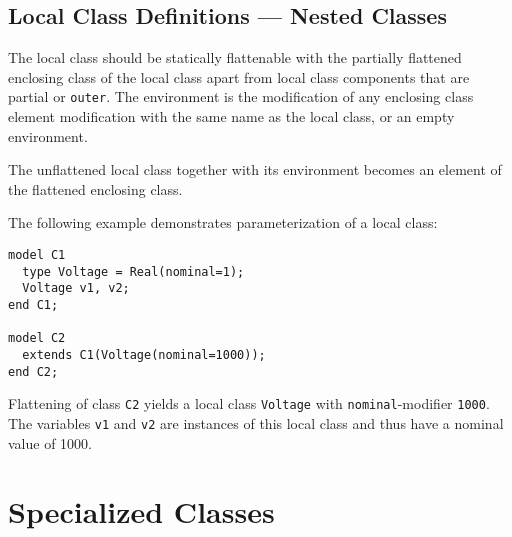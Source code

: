 \subsection{Local Class Definitions --- Nested Classes}\label{local-class-definitions-nested-classes}

The local class should be statically flattenable with the partially
flattened enclosing class of the local class apart from local class
components that are partial or \lstinline!outer!. The environment is the
modification of any enclosing class element modification with the same
name as the local class, or an empty environment.

The unflattened local class together with its environment becomes an
element of the flattened enclosing class.

\begin{example}
The following example demonstrates parameterization of a local class:
\begin{lstlisting}[language=modelica]
model C1
  type Voltage = Real(nominal=1);
  Voltage v1, v2;
end C1;

model C2
  extends C1(Voltage(nominal=1000));
end C2;
\end{lstlisting}

Flattening of class \lstinline!C2! yields a local class \lstinline!Voltage! with
\lstinline!nominal!-modifier \lstinline!1000!. The variables \lstinline!v1! and \lstinline!v2! are
instances of this local class and thus have a nominal value of 1000.
\end{example}

\section{Specialized Classes}\label{specialized-classes}


